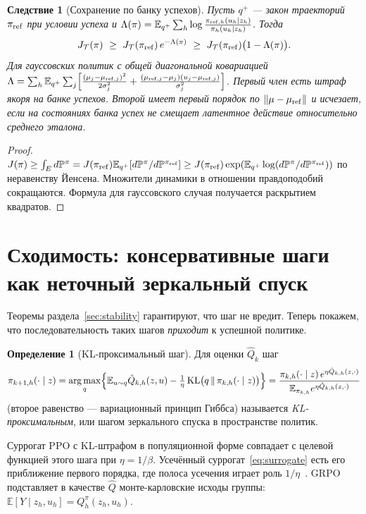 \documentclass[11pt,a4paper]{article}
\theoremstyle{plain}
\newtheorem{corollary}[theorem]{Следствие}
\theoremstyle{definition}
\newtheorem{definition}[theorem]{Определение}
\theoremstyle{remark}
\newcommand{\E}{\mathbb{E}}
\newcommand{\PP}{\mathbb{P}}
\DeclareMathOperator{\KL}{KL}
\DeclareMathOperator*{\argmax}{arg\,max}
\newcommand{\cT}{\mathcal{T}}
\begin{document}
\begin{corollary}[Сохранение по банку успехов]\label{cor:anchor-success}
Пусть $q^+$ --- закон траекторий $\pi_{\rm ref}$ при условии успеха и
$\Lambda(\pi)=\E_{q^+}\sum_h\log\frac{\pi_{{\rm ref},h}(u_h\mid z_h)}{\pi_h(u_h\mid z_h)}$. Тогда
\[
J_\cT(\pi)\ \ge\ J_\cT(\pi_{\rm ref})\,e^{-\Lambda(\pi)}\ \ge\ J_\cT(\pi_{\rm ref})\bigl(1-\Lambda(\pi)\bigr).
\]
Для гауссовских политик с общей диагональной ковариацией
$\Lambda=\sum_h\E_{q^+}\sum_j\Bigl[\frac{(\mu_j-\mu_{{\rm ref},j})^2}{2\sigma_j^2}+\frac{(\mu_{{\rm ref},j}-\mu_j)(u_j-\mu_{{\rm ref},j})}{\sigma_j^2}\Bigr]$.
Первый член есть штраф якоря на банке успехов. Второй имеет первый порядок по $\|\mu-\mu_{\rm ref}\|$ и исчезает, если на состояниях банка успех не смещает латентное действие относительно среднего эталона.
\end{corollary}
\begin{proof}
$J(\pi)\ge\int_E d\PP^\pi=J(\pi_{\rm ref})\E_{q^+}[d\PP^\pi/d\PP^{\pi_{\rm ref}}]\ge J(\pi_{\rm ref})\exp(\E_{q^+}\log(d\PP^\pi/d\PP^{\pi_{\rm ref}}))$ по неравенству Йенсена. Множители динамики в отношении правдоподобий сокращаются. Формула для гауссовского случая получается раскрытием квадратов.
\end{proof}

\section{Сходимость: консервативные шаги как неточный зеркальный спуск}\label{sec:convergence}

Теоремы раздела~\ref{sec:stability} гарантируют, что шаг не вредит. Теперь покажем, что последовательность таких шагов \emph{приходит} к успешной политике.

\begin{definition}[KL-проксимальный шаг]\label{def:md}
Для оценки $\hat Q_k$ шаг
\[
\pi_{k+1,h}(\cdot\mid z)=\argmax_q\Bigl\{\E_{u\sim q}\hat Q_{k,h}(z,u)-\tfrac1\eta\KL\bigl(q\,\|\,\pi_{k,h}(\cdot\mid z)\bigr)\Bigr\}
=\frac{\pi_{k,h}(\cdot\mid z)\,e^{\eta\hat Q_{k,h}(z,\cdot)}}{\E_{\pi_{k,h}}e^{\eta\hat Q_{k,h}(z,\cdot)}}
\]
(второе равенство --- вариационный принцип Гиббса) называется \emph{KL-проксимальным}, или шагом зеркального спуска в пространстве политик.
\end{definition}

Суррогат PPO с KL-штрафом в популяционной форме совпадает с целевой функцией этого шага при $\eta=1/\beta$. Усечённый суррогат~\eqref{eq:surrogate} есть его приближение первого порядка, где полоса усечения играет роль $1/\eta$~\cite{mdpo,lan,shani,neural-ppo}. GRPO подставляет в качестве $\hat Q$ монте-карловские исходы группы: $\E[Y\mid z_h,u_h]=Q^\pi_h(z_h,u_h)$.
\end{document}
